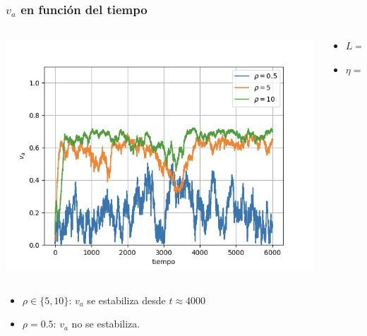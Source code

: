 \begin{frame}
\frametitle{\(v_a\) en función del tiempo}
\begin{columns}
    \begin{column}{0.6\textwidth}
      \begin{center}
        \includegraphics[width=\textwidth]{images/va-vs-tiempo-density.jpeg} %
      \end{center}
    \end{column}
    \begin{column}{0.4\textwidth}
\begin{center}
            \footnotesize
        \begin{itemize}
        \item \(L = 20\)
        \item \(\eta = 2.5\)
        \end{itemize}
\end{center}
    \end{column}
\end{columns}
        \begin{itemize}
        \item \(\rho \in \{5,10\}\): \(v_a\) se estabiliza desde \(t \approx 4000\)
        \item \(\rho = 0.5\): \(v_a\) no se estabiliza.
        \end{itemize}
\end{frame}


